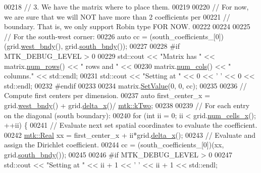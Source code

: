 \begin{DoxyCode}
00218   \textcolor{comment}{// 3. We have the matrix where to place them.}
00219 
00220   \textcolor{comment}{// For now, we are sure that we will NOT have more than 2 coefficients per}
00221   \textcolor{comment}{// boundary. That is, we only support Robin type FOR NOW.}
00222 
00224 
00225   \textcolor{comment}{// For the south-west corner:}
00226   \textcolor{keyword}{auto} cc = (south\_coefficients\_[0])(grid.\hyperlink{classmtk_1_1UniStgGrid2D_af2b1712387ded85edaf2b64617d3fc13}{west\_bndy}(), grid.\hyperlink{classmtk_1_1UniStgGrid2D_a1442eaf219f099d0ebf46a170fdebf92}{south\_bndy}());
00227 
00228 \textcolor{preprocessor}{  #if MTK\_DEBUG\_LEVEL > 0}
00229   std::cout << \textcolor{stringliteral}{"Matrix has "} << matrix.\hyperlink{classmtk_1_1DenseMatrix_a53f3afb3b6a8d21854458aaa9663cc74}{num\_rows}() << \textcolor{stringliteral}{" rows and "} <<
00230     matrix.\hyperlink{classmtk_1_1DenseMatrix_a41747502d468c6728a4be31501b16e0e}{num\_cols}() << \textcolor{stringliteral}{" columns."} << std::endl;
00231   std::cout << \textcolor{stringliteral}{"Setting at "} << 0 << \textcolor{charliteral}{' '} << 0 << std::endl;
00232 \textcolor{preprocessor}{  #endif}
00233 
00234   matrix.\hyperlink{classmtk_1_1DenseMatrix_a784ce5784109ac86bfb9d8562b334b13}{SetValue}(0, 0, cc);
00235 
00236   \textcolor{comment}{// Compute first centers per dimension.}
00237   \textcolor{keyword}{auto} first\_center\_x = grid.\hyperlink{classmtk_1_1UniStgGrid2D_af2b1712387ded85edaf2b64617d3fc13}{west\_bndy}() + grid.\hyperlink{classmtk_1_1UniStgGrid2D_aca4710004c4a7da6a9e8fd6ab32a691f}{delta\_x}()/
      \hyperlink{group__c01-roots_gaf39c2d851a2db744f4feb1c5ab3ec2cf}{mtk::kTwo};
00238 
00239   \textcolor{comment}{// For each entry on the diagonal (south boundary):}
00240   \textcolor{keywordflow}{for} (\textcolor{keywordtype}{int} ii = 0; ii < grid.\hyperlink{classmtk_1_1UniStgGrid2D_a2d182866a398aba8e4829590e85bf939}{num\_cells\_x}(); ++ii) \{
00241     \textcolor{comment}{// Evaluate next set spatial coordinates to evaluate the coefficient.}
00242     \hyperlink{group__c01-roots_gac080bbbf5cbb5502c9f00405f894857d}{mtk::Real} xx = first\_center\_x + ii*grid.\hyperlink{classmtk_1_1UniStgGrid2D_aca4710004c4a7da6a9e8fd6ab32a691f}{delta\_x}();
00243     \textcolor{comment}{// Evaluate and assign the Dirichlet coefficient.}
00244     cc = (south\_coefficients\_[0])(xx, grid.\hyperlink{classmtk_1_1UniStgGrid2D_a1442eaf219f099d0ebf46a170fdebf92}{south\_bndy}());
00245 
00246 \textcolor{preprocessor}{    #if MTK\_DEBUG\_LEVEL > 0}
00247     std::cout << \textcolor{stringliteral}{"Setting at "} << ii + 1 << \textcolor{charliteral}{' '} << ii + 1 << std::endl;

\end{DoxyCode}
